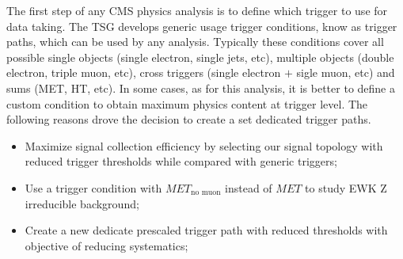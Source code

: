 % 
%
%
%
%




The first step of any \gls{CMS} physics analysis is to define which trigger to use for data taking. The \gls{TSG} develops generic usage trigger conditions, know as trigger paths, which can be used by any analysis. Typically these conditions cover all possible single objects (single electron, single jets, etc), multiple objects (double electron, triple muon, etc), cross triggers (single electron $+$ sigle muon, etc) and sums (\gls{MET}, \gls{HT}, etc). In some cases, as for this analysis, it is better to define a custom condition to obtain maximum physics content at trigger level. The following reasons drove the decision to create a set dedicated trigger paths.

\begin{itemize}
  \item Maximize signal collection efficiency by selecting our signal topology with reduced trigger thresholds while compared with generic triggers;
  \item Use a trigger condition with $MET_{\text{no muon}}$ instead of $MET$ to study \gls{EWK} Z irreducible background;
  \item Create a new dedicate prescaled trigger path with reduced thresholds with objective of reducing systematics;
\end{itemize}

